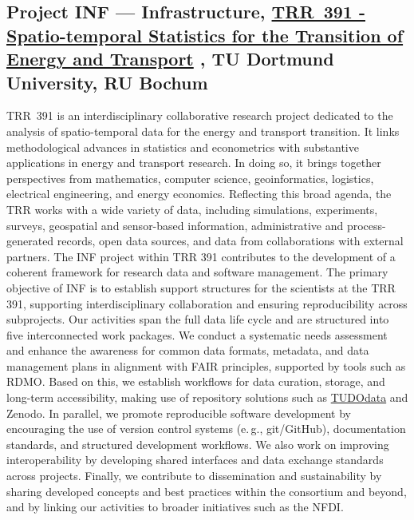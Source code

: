 \documentclass{eceasst}
\newcommand{\eg}{e.\,g.}
\begin{document}
\subsection{Project INF --- Infrastructure, \href{https://trr391.tu-dortmund.de/}{TRR~391 - Spatio-temporal Statistics for the Transition of Energy and Transport}
, TU Dortmund University, RU Bochum}
TRR~391 is an interdisciplinary collaborative research project dedicated to the analysis of
spatio-temporal data for the energy and transport transition. It links methodological
advances in statistics and econometrics with substantive applications in energy and transport
research. In doing so, it brings together perspectives from mathematics, computer science,
geoinformatics, logistics, electrical engineering, and energy economics. Reflecting this broad
agenda, the TRR works with a wide variety of data, including simulations, experiments,
surveys, geospatial and sensor-based information, administrative and process-generated
records, open data sources, and data from collaborations with external partners.
The INF project within TRR 391 contributes to the development of a coherent framework for
research data and software management. The primary objective of INF is to establish support
structures for the scientists at the TRR 391, supporting interdisciplinary collaboration and
ensuring reproducibility across subprojects.
Our activities span the full data life cycle and are structured into five interconnected work
packages.
We conduct a systematic needs assessment and enhance the awareness for common data
formats, metadata, and data management plans in alignment with FAIR principles, supported
by tools such as RDMO. Based on this, we establish workflows for data curation, storage, and
long-term accessibility, making use of repository solutions such as \href{https://data.tu-dortmund.de/}{TUDOdata} and Zenodo.
In parallel, we promote reproducible software development by encouraging the use of
version control systems (\eg, git/GitHub), documentation standards, and structured
development workflows. We also work on improving interoperability by developing shared
interfaces and data exchange standards across projects.
Finally, we contribute to dissemination and sustainability by sharing developed concepts and
best practices within the consortium and beyond, and by linking our activities to broader
initiatives such as the NFDI.
\end{document}
